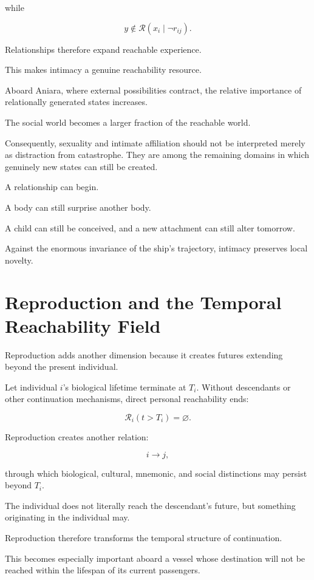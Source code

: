 \documentclass[11pt,oneside]{book}
\theoremstyle{definition}
\theoremstyle{remark}
\newcommand{\R}{\mathcal{R}}
\begin{document}
while

\[
y\notin\R(x_i\mid\neg r_{ij}).
\]

Relationships therefore expand reachable experience.

This makes intimacy a genuine reachability resource.

Aboard Aniara, where external possibilities contract, the relative importance of relationally generated states increases.

The social world becomes a larger fraction of the reachable world.

Consequently, sexuality and intimate affiliation should not be interpreted merely as distraction from catastrophe. They are among the remaining domains in which genuinely new states can still be created.

A relationship can begin.

A body can still surprise another body.

A child can still be conceived, and a new attachment can still alter tomorrow.

Against the enormous invariance of the ship's trajectory, intimacy preserves local novelty.

\section{Reproduction and the Temporal Reachability Field}

Reproduction adds another dimension because it creates futures extending beyond the present individual.

Let individual \(i\)'s biological lifetime terminate at \(T_i\). Without descendants or other continuation mechanisms, direct personal reachability ends:

\[
\R_i(t>T_i)=\varnothing.
\]

Reproduction creates another relation:

\[
i\rightarrow j,
\]

through which biological, cultural, mnemonic, and social distinctions may persist beyond \(T_i\).

The individual does not literally reach the descendant's future, but something originating in the individual may.

Reproduction therefore transforms the temporal structure of continuation.

This becomes especially important aboard a vessel whose destination will not be reached within the lifespan of its current passengers.
\end{document}
